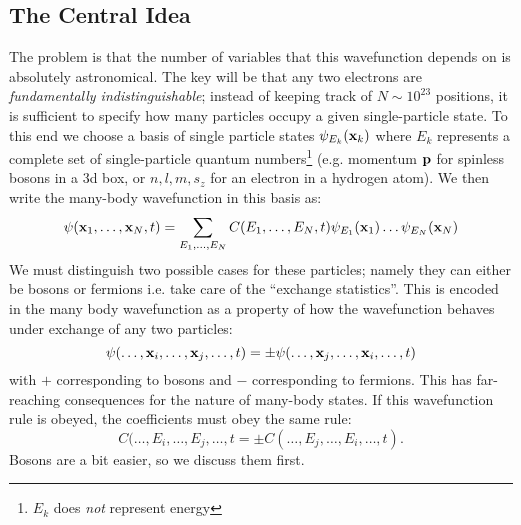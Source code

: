 \subsection{The Central Idea}
The problem is that the number of variables that this wavefunction depends on is absolutely astronomical. The key will be that any two electrons are \emph{fundamentally indistinguishable}; instead of keeping track of $N \sim 10^{23}$ positions, it is sufficient to specify how many particles occupy a given single-particle state. To this end we choose a basis of single particle states $\psi_{E_k}(\mathbf{x}_k)$ where $E_k$ represents a complete set of single-particle quantum numbers\footnote{$E_k$ does \emph{not} represent energy} (e.g. momentum $\mathbf{p}$ for spinless bosons in a 3d box, or $n, l, m, s_z$ for an electron in a hydrogen atom). We then write the many-body wavefunction in this basis as:
\begin{equation}
    \psi(\mathbf{x}_1, \ldots, \mathbf{x}_N, t) = \sum_{E_1, \ldots, E_N}C(E_1, \ldots, E_N, t)\psi_{E_1}(\mathbf{x}_1)\ldots \psi_{E_N}(\mathbf{x}_N)
\end{equation}
We must distinguish two possible cases for these particles; namely they can either be bosons or fermions i.e. take care of the ``exchange statistics''. This is encoded in the many body wavefunction as a property of how the wavefunction behaves under exchange of any two particles:
\begin{equation}
    \psi(\ldots, \mathbf{x}_i, \ldots, \mathbf{x}_j, \ldots, t) = \pm \psi(\ldots, \mathbf{x}_j, \ldots, \mathbf{x}_i, \ldots, t)
\end{equation}
with $+$ corresponding to bosons and $-$ corresponding to fermions. This has far-reaching consequences for the nature of many-body states. If this wavefunction rule is obeyed, the coefficients must obey the same rule:
\begin{equation}
    C(\ldots, E_i, \ldots, E_j, \ldots, t = \pm C(\ldots, E_j, \ldots, E_i, \ldots, t).
\end{equation}
Bosons are a bit easier, so we discuss them first.


